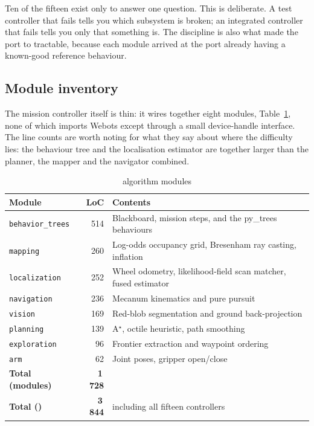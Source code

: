 Ten of the fifteen exist only to answer one question. This is
deliberate. A test controller that fails tells you which subsystem is
broken; an integrated controller that fails tells you only that
something is. The discipline is also what made the port to \phaseB{}
tractable, because each module arrived at the port already having a
known-good reference behaviour.

\subsection{Module inventory}

The mission controller itself is thin: it wires together eight modules,
Table~\ref{tab:phaseA_modules}, none of which imports Webots except
through a small device-handle interface. The line counts are worth
noting for what they say about where the difficulty lies: the behaviour
tree and the localisation estimator are together larger than the
planner, the mapper and the navigator combined.

\begin{table}[!t]
\caption{\phaseA{} algorithm modules}
\label{tab:phaseA_modules}
\centering\footnotesize
\begin{tabular}{@{}p{}rp{}@{}}
\toprule
\textbf{Module} & \textbf{LoC} & \textbf{Contents}\\
\midrule
\texttt{behavior\_trees} & 514 & Blackboard, mission steps, and the
                                 py\_trees behaviours\\
\texttt{mapping}         & 260 & Log-odds occupancy grid, Bresenham
                                 ray casting, inflation\\
\texttt{localization}    & 252 & Wheel odometry, likelihood-field scan
                                 matcher, fused estimator\\
\texttt{navigation}      & 236 & Mecanum kinematics and pure pursuit\\
\texttt{vision}          & 169 & Red-blob segmentation and ground
                                 back-projection\\
\texttt{planning}        & 139 & A$^\star$, octile heuristic, path
                                 smoothing\\
\texttt{exploration}     &  96 & Frontier extraction and waypoint
                                 ordering\\
\texttt{arm}             &  62 & Joint poses, gripper open/close\\
\midrule
\textbf{Total (modules)} & \textbf{1\,728} & \\
\textbf{Total (\phaseA{})} & \textbf{3\,844} & including all fifteen
                                              controllers\\
\bottomrule
\end{tabular}
\end{table}

